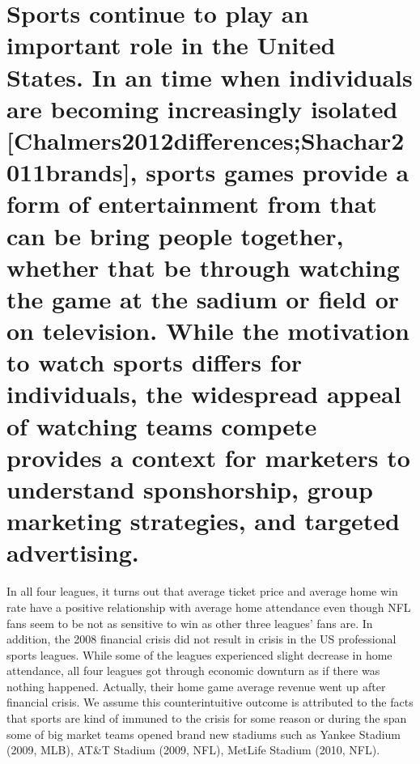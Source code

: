 \documentclass[man, fleqn, noextraspace,floatsintext]{apa6}
\begin{document}
\hypertarget{sports-continue-to-play-an-important-role-in-the-united-states.-in-an-time-when-individuals-are-becoming-increasingly-isolated-chalmers2012differencesshachar2011brands-sports-games-provide-a-form-of-entertainment-from-that-can-be-bring-people-together-whether-that-be-through-watching-the-game-at-the-sadium-or-field-or-on-television.-while-the-motivation-to-watch-sports-differs-for-individuals-the-widespread-appeal-of-watching-teams-compete-provides-a-context-for-marketers-to-understand-sponshorship-group-marketing-strategies-and-targeted-advertising.}{%
\section{Sports continue to play an important role in the United States. In an time when individuals are becoming increasingly isolated {[}Chalmers2012differences;Shachar2011brands{]}, sports games provide a form of entertainment from that can be bring people together, whether that be through watching the game at the sadium or field or on television. While the motivation to watch sports differs for individuals, the widespread appeal of watching teams compete provides a context for marketers to understand sponshorship, group marketing strategies, and targeted advertising.}\label{sports-continue-to-play-an-important-role-in-the-united-states.-in-an-time-when-individuals-are-becoming-increasingly-isolated-chalmers2012differencesshachar2011brands-sports-games-provide-a-form-of-entertainment-from-that-can-be-bring-people-together-whether-that-be-through-watching-the-game-at-the-sadium-or-field-or-on-television.-while-the-motivation-to-watch-sports-differs-for-individuals-the-widespread-appeal-of-watching-teams-compete-provides-a-context-for-marketers-to-understand-sponshorship-group-marketing-strategies-and-targeted-advertising.}}

In all four leagues, it turns out that average ticket price and average home win rate have a positive relationship with average home attendance even though NFL fans seem to be not as sensitive to win as other three leagues' fans are. In addition, the 2008 financial crisis did not result in crisis in the US professional sports leagues. While some of the leagues experienced slight decrease in home attendance, all four leagues got through economic downturn as if there was nothing happened. Actually, their home game average revenue went up after financial crisis. We assume this counterintuitive outcome is attributed to the facts that sports are kind of immuned to the crisis for some reason or during the span some of big market teams opened brand new stadiums such as Yankee Stadium (2009, MLB), AT\&T Stadium (2009, NFL), MetLife Stadium (2010, NFL).
\end{document}
